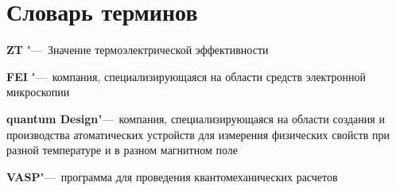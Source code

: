 \chapter*{Словарь терминов}             %

\textbf{ZT} "---~Значение термоэлектрической эффективности

\textbf{FEI} "---~компания, специализирующаяся на области средств электронной микроскопии

\textbf{quantum Design}"---~компания, специализирующаяся на области создания и производства атоматических устройств для измерения физических свойств при разной температуре и в разном магнитном поле

\textbf{VASP}"---~программа для проведения квантомеханических расчетов 
